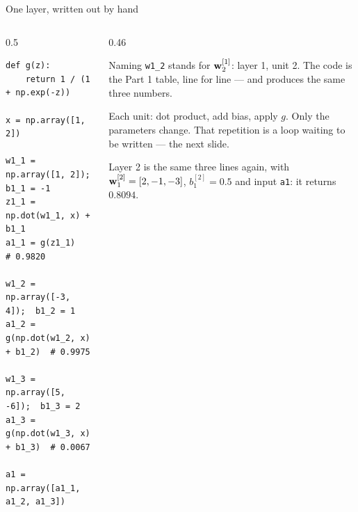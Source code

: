 \documentclass[aspectratio=169,10pt]{beamer}
\begin{document}
\begin{frame}[fragile]{One layer, written out by hand}
  \begin{columns}[T,onlytextwidth]
    \begin{column}{0.5\textwidth}
\begin{lstlisting}
def g(z):
    return 1 / (1 + np.exp(-z))

x = np.array([1, 2])

w1_1 = np.array([1, 2]);   b1_1 = -1
z1_1 = np.dot(w1_1, x) + b1_1
a1_1 = g(z1_1)                    # 0.9820

w1_2 = np.array([-3, 4]);  b1_2 = 1
a1_2 = g(np.dot(w1_2, x) + b1_2)  # 0.9975

w1_3 = np.array([5, -6]);  b1_3 = 2
a1_3 = g(np.dot(w1_3, x) + b1_3)  # 0.0067

a1 = np.array([a1_1, a1_2, a1_3])
\end{lstlisting}
    \end{column}
    \begin{column}{0.46\textwidth}
      \footnotesize
      \begin{block}{Naming}
        \texttt{w1\_2} stands for $\mathbf{w}^{[1]}_2$: layer 1, unit 2. The code is the
        Part 1 table, line for line --- and produces the same three numbers.
      \end{block}
      \begin{keyidea}
        Each unit: dot product, add bias, apply $g$. Only the parameters change. That
        repetition is a loop waiting to be written --- the next slide.
      \end{keyidea}
      Layer 2 is the same three lines again, with $\mathbf{w}^{[2]}_1=[2,-1,-3]$,
      $b^{[2]}_1=0.5$ and input \texttt{a1}: it returns $0.8094$.
    \end{column}
  \end{columns}
\end{frame}
\end{document}
